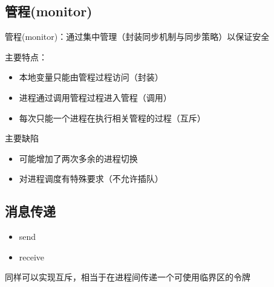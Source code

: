\subsection{管程(monitor)}
管程(monitor)：通过集中管理（封装同步机制与同步策略）以保证安全

主要特点：
\begin{itemize}
    \item 本地变量只能由管程过程访问（封装）
    \item 进程通过调用管程过程进入管程（调用）
    \item 每次只能一个进程在执行相关管程的过程（互斥）
\end{itemize}
主要缺陷
\begin{itemize}
    \item 可能增加了两次多余的进程切换
    \item 对进程调度有特殊要求（不允许插队）
\end{itemize}

\subsection{消息传递}
\begin{itemize}
    \item send
    \item receive
\end{itemize}

同样可以实现互斥，相当于在进程间传递一个可使用临界区的令牌